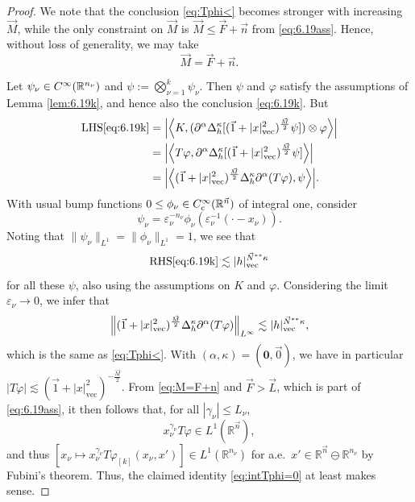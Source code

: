 \documentclass[11pt, reqno]{amsart}
\theoremstyle{definition}
\theoremstyle{remark}
\numberwithin{equation}{section}
\newcommand{\vF}{\vec F}
\newcommand{\R}{\mathbb R}
\newcommand{\vn}{\vec n}
\newcommand{\eps}{\varepsilon}
\newcommand{\Bpair}[2]{\Big\langle #1, #2 \Big\rangle}
\newcommand{\abs}[1]{|#1|}
\newcommand{\Babs}[1]{\Big|#1\Big|}
\newcommand{\Norm}[2]{\|#1\|_{#2}}
\newcommand{\BNorm}[2]{\Big\|#1\Big\|_{#2}}
\begin{document}
\begin{proof}
We note that the conclusion \eqref{eq:Tphi<} becomes stronger with increasing $\vec M$, while the only constraint on $\vec M$ is $\vec M\leq\vec F+\vn$ from \eqref{eq:6.19ass}. Hence, without loss of generality, we may take
\begin{equation}\label{eq:M=F+n}
  \vec M=\vec F+\vn.
\end{equation}

Let $\psi_\nu\in C_{\rm}^\infty(\R^{n_\nu})$ and $\psi:=\bigotimes_{\nu=1}^k\psi_\nu$. Then $\psi$ and $\varphi$ satisfy the assumptions of Lemma \ref{lem:6.19k}, and hence also the conclusion \eqref{eq:6.19k}. But
\begin{equation*}
\begin{split}
  \mathrm{LHS}\eqref{eq:6.19k}
 &= \Babs{  \Bpair{K}{  (\partial^\alpha\Delta_{h}^{\kappa}[(\vec 1+\abs{x}_{\mathrm{vec}}^2)^{\frac{\vec M}{2}}\psi])\otimes\varphi} } \\
 &= \Babs{  \Bpair{T\varphi }{  \partial^\alpha\Delta_{h}^{\kappa}[(\vec 1+\abs{x}_{\mathrm{vec}}^2)^{\frac{\vec M}{2}}\psi]} } \\
 &= \Babs{  \Bpair{  (\vec 1+\abs{x}_{\mathrm{vec}}^2)^{\frac{\vec M}{2}}\Delta_{h}^{\kappa}\partial^\alpha(T\varphi) }{ \psi} }.
\end{split}
\end{equation*}
With usual bump functions $0\leq \phi_\nu\in C_{\rm c}^\infty(\R^{\vn})$ of integral one,
consider $$\psi_\nu=\eps_\nu^{-n_\nu}\phi_\nu(\eps_\nu^{-1}(\cdot-x_\nu)).$$
Noting that $\Norm{\psi_\nu}{L^1}=\Norm{\phi_\nu}{L^1}=1$, we see that
\begin{equation*}
  \mathrm{RHS}\eqref{eq:6.19k}\lesssim\abs{h}_{\rm{vec}}^{\vec N^{**}\kappa}
\end{equation*}
for all these $\psi$, also using the assumptions on $K$ and $\varphi$. Considering the limit $\eps_\nu\to 0$, we infer that
\begin{equation*}
  \BNorm{
   (\vec 1+\abs{x}_{\mathrm{vec}}^2)^{\frac{\vec M}{2}}\Delta_{h}^{\kappa}\partial^\alpha(T\varphi)  }{L^\infty}
  \lesssim\abs{h}_{\rm{vec}}^{\vec N^{**}\kappa},
\end{equation*}
which is the same as \eqref{eq:Tphi<}. With $(\alpha,\kappa)=(\mathbf 0,\vec 0)$, we have in particular $\abs{T\varphi}\lesssim(\vec 1+\abs{x}_{\mathrm{vec}}^2)^{-\frac{\vec M}{2}}$. From \eqref{eq:M=F+n} and $\vF>\vec L$, which is part of \eqref{eq:6.19ass}, it then follows that, for all $\abs{\gamma_\nu}\leq L_\nu$,
\begin{equation}\label{eq:TphiL1}
   x_\nu^{\gamma_{\nu}}T\varphi\in L^1(\R^{\vn}),
\end{equation}
and thus $[x_\nu\mapsto x_\nu^{\gamma_{\nu}}T\varphi_{[k]}(x_\nu,x')]\in L^1(\R^{n_\nu})$ for a.e.\ $x'\in\R^{\vn}\ominus\R^{n_\nu}$ by Fubini's theorem. Thus, the claimed identity \eqref{eq:intTphi=0} at least makes sense.


\end{proof}
\end{document}
